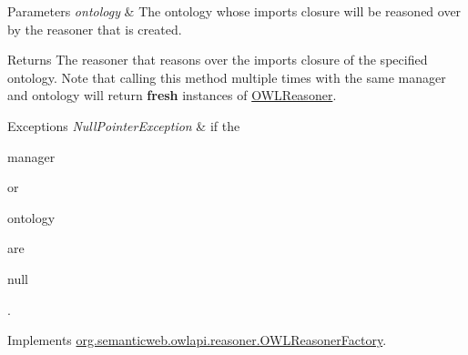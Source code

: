 \begin{DoxyParams}{Parameters}
{\em ontology} & The ontology whose imports closure will be reasoned over by the reasoner that is created. \\
\hline
\end{DoxyParams}
\begin{DoxyReturn}{Returns}
The reasoner that reasons over the imports closure of the specified ontology. Note that calling this method multiple times with the same manager and ontology will return {\bfseries fresh} instances of \hyperlink{interfaceorg_1_1semanticweb_1_1owlapi_1_1reasoner_1_1_o_w_l_reasoner}{O\-W\-L\-Reasoner}. 
\end{DoxyReturn}

\begin{DoxyExceptions}{Exceptions}
{\em Null\-Pointer\-Exception} & if the
\begin{DoxyCode}
manager 
\end{DoxyCode}
 or
\begin{DoxyCode}
ontology 
\end{DoxyCode}
 are
\begin{DoxyCode}
null 
\end{DoxyCode}
 . \\
\hline
\end{DoxyExceptions}


Implements \hyperlink{interfaceorg_1_1semanticweb_1_1owlapi_1_1reasoner_1_1_o_w_l_reasoner_factory_a48bc5b1f96b78f756f84b3f1f7d58a66}{org.\-semanticweb.\-owlapi.\-reasoner.\-O\-W\-L\-Reasoner\-Factory}.

